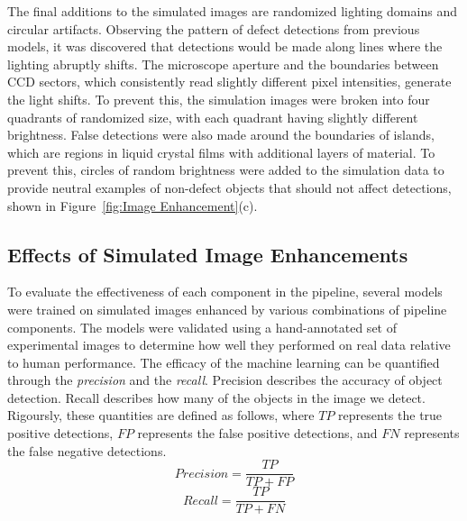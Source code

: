 \documentclass[twoside,twocolumn,9pt]{article}
\begin{document}
The final additions to the simulated images are randomized lighting domains and circular artifacts. Observing the pattern of defect detections from previous models, it was discovered that detections would be made along lines where the lighting abruptly shifts. The microscope aperture and the boundaries between CCD sectors, which consistently read slightly different pixel intensities, generate the light shifts. To prevent this, the simulation images were broken into four quadrants of randomized size, with each quadrant having slightly different brightness. False detections were also made around the boundaries of islands, which are regions in liquid crystal films with additional layers of material. To prevent this, circles of random brightness were added to the simulation data to provide neutral examples \cite{koppel_importance_2006} of non-defect objects that should not affect detections, shown in Figure~\ref{fig:Image Enhancement}(c).

\subsection{Effects of Simulated Image Enhancements}

To evaluate the effectiveness of each component in the pipeline, several models were trained on simulated images enhanced by various combinations of pipeline components. The models were validated using a hand-annotated set of experimental images to determine how well they performed on real data relative to human performance. The efficacy of the machine learning can be quantified through the \textit{precision} and the \textit{recall}. Precision describes the accuracy of object detection. Recall describes how many of the objects in the image we detect. Rigoursly, these quantities are defined as follows, where $TP$ represents the true positive detections, $FP$ represents the false positive detections, and $FN$ represents the false negative detections.
\begin{equation}
Precision = \frac{TP}{TP+FP}
\end{equation}
\begin{equation}
Recall = \frac{TP}{TP+FN}
\end{equation} 
\end{document}
